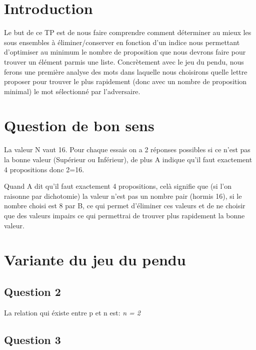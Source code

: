 \documentclass[a4paper,12pt]{report}
\begin{document}


\setcounter{page}{1} 
\newpage

\section*{Introduction}

Le but de ce TP est de nous faire comprendre comment déterminer au mieux les sous ensembles à éliminer/conserver en fonction d'un indice nous permettant d'optimiser au minimum le nombre de proposition que nous devrons faire pour trouver un élément parmis une liste. Concrètement avec le jeu du pendu, nous ferons une première analyse des mots dans laquelle nous choisirons quelle lettre proposer pour trouver le plus rapidement (donc avec un nombre de proposition minimal) le mot sélectionné par l'adversaire.

\section*{Question de bon sens}

La valeur N vaut 16. Pour chaque essais on a 2 réponses possibles si ce n'est pas la bonne valeur (Supérieur ou Inférieur), de plus A indique qu'il faut exactement 4 propositions donc 2=16. 

Quand A dit qu'il faut exactement 4 propositions, celà signifie que (si l'on raisonne par dichotomie) la valeur n'est pas un nombre pair (hormis 16), si le nombre choisi est 8 par B, ce qui permet d'éliminer ces valeurs et de ne choisir que des valeurs impairs ce qui permettrai de trouver plus rapidement la bonne valeur.

\section*{Variante du jeu du pendu}

\subsection*{Question 2}

	La relation qui éxiste entre p et n est: \textit{n = 2}

\subsection*{Question 3}
\end{document}
